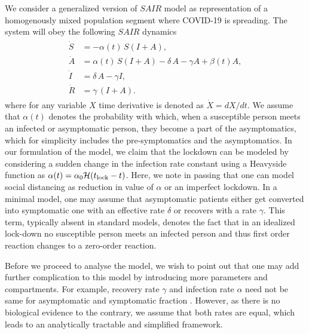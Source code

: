 \documentclass[aps,prl,reprint,superscriptaddress]{revtex4-1}
\begin{document}
We consider a generalized version of $SAIR$ model as representation of a homogenously mixed population segment  where COVID-19 is spreading. The system will obey the following $SAIR$ dynamics
\begin{align}
\label{Basic1}
 \begin{split}
\dot{S} &= -\alpha(t) \, S  \left(I+A\right),\\
\dot{A} &=  \alpha(t) \,S  \left(  I+   A\right) -\delta\, A-\gamma A+\beta(t) A,
  \\
 \dot{I} &=\delta\, A-\gamma I,\\
 \dot{R} &= \gamma \, (I+A).
 \end{split}
\end{align}
where for any variable $X$ time derivative is denoted as  $\dot{X} =dX/dt$. We assume that  $\alpha(t)$ denotes the probability with which, when a susceptible person meets an infected or asymptomatic person, they become a part of the asymptomatics, which for simplicity includes the pre-symptomatics and the asymptomatics. In our formulation of the model, we claim that the lockdown can be modeled by considering a sudden change in the infection rate constant using a Heavyside function as $\alpha(t)=\alpha_0 {\cal H}(t_{\rm lock} - t )$.  Here, we note in passing that one can model social distancing as reduction in value of $\alpha$ or an imperfect lockdown. In a minimal model, one may assume that asymptomatic patients either get converted into symptomatic one with an effective rate $\delta$ or recovers with a rate $\gamma$. %
This term, typically absent in standard models, denotes the fact that in an idealized lock-down no susceptible  person meets an infected person and thus first order reaction changes to a zero-order reaction.  

Before we proceed to analyse the model, we wish to point out that one may add further complication to this model by introducing more parameters and compartments. For example, recovery rate $\gamma$ and infection rate $\alpha$ need not be same for asymptomatic and symptomatic fraction \cite{robinson2013model}. However, as there is no biological evidence to the contrary, we assume that both rates are equal, which leads to an analytically tractable and simplified framework. 
\end{document}
